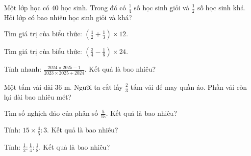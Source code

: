 \begin{ex}
  Một lớp học có $40$ học sinh. Trong đó có $\frac{1}{4}$ số học sinh giỏi và $\frac{1}{2}$ số học sinh khá. Hỏi lớp có bao nhiêu học sinh giỏi và khá?
\end{ex}

\begin{ex}
  Tìm giá trị của biểu thức: $(\frac{1}{2} + \frac{1}{3}) \times 12$.
\end{ex}

\begin{ex}
  Tìm giá trị của biểu thức: $(\frac{3}{4} - \frac{1}{6}) \times 24$.
\end{ex}

\begin{ex}
  Tính nhanh: $\frac{2024 \times 2025 - 1}{2023 \times 2025 + 2024}$. Kết quả là bao nhiêu?
\end{ex}

\begin{ex}
  Một tấm vải dài $36\text{ m}$. Người ta cắt lấy $\frac{2}{3}$ tấm vải để may quần áo. Phần vải còn lại dài bao nhiêu mét?
\end{ex}

\begin{ex}
  Tìm số nghịch đảo của phân số $\frac{5}{15}$. Kết quả là bao nhiêu?
\end{ex}

\begin{ex}
  Tính: $15 \times \frac{4}{5} : 3$. Kết quả là bao nhiêu?
\end{ex}

\begin{ex}
  Tính: $\frac{1}{2} : \frac{1}{4} : \frac{1}{8}$. Kết quả là bao nhiêu?
\end{ex}

